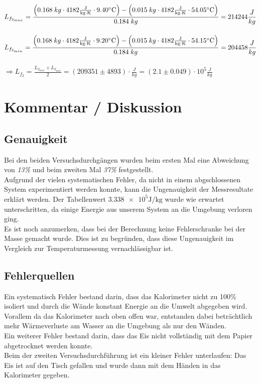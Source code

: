 \documentclass[a4paper,12pt]{article}
\begin{document}
$L_{f_{2_{max}}} =\displaystyle{\frac{\left(0.168\;kg \cdot 4182\rm{\frac{J}{kg \cdot K}}\cdot 9.40^{\circ}C \right)-\left(0.015\;kg\cdot 4182 \rm{\frac{J}{kg \cdot K}} \cdot 54.05^{\circ}C\right)}{0.184\;kg}} = 214244\frac{J}{kg}$\\\\

$L_{f_{2_{min}}} =\displaystyle{\frac{\left(0.168\;kg \cdot 4182\rm{\frac{J}{kg \cdot K}}\cdot 9.20^{\circ}C \right)-\left(0.015\;kg\cdot 4182 \rm{\frac{J}{kg \cdot K}} \cdot 54.15^{\circ}C\right)}{0.184\;kg}} = 204458\frac{J}{kg}$\\\\

$\Rightarrow L_{f_2}=\displaystyle{\frac{L_{2_{max}}+L_{2_{min}}}{2}=\left(209351\pm 4893\right) \cdot \frac{J}{kg}=\left(2.1\pm 0.049\right)\cdot 10^{5} \frac{J}{kg}}$

\newpage
\section{Kommentar / Diskussion}

\subsection{Genauigkeit}
Bei den beiden Versuchsdurchgängen wurden beim ersten Mal eine Abweichung von \textit{13\%} und beim zweiten Mal \textit{37\%} festgestellt.\\

Aufgrund der vielen systematischen Fehler, da nicht in einem abgschlossenen System experimentiert werden konnte, kann die Ungenauigkeit der Messresultate erklärt werden. Der Tabellenwert $ \num{3.338 e5}\si{\J\per\kg} $ wurde wie erwartet unterschritten, da einige Energie aus unserem System an die Umgebung verloren ging.\\

Es ist noch anzumerken, dass bei der Berechnung keine Fehlerschranke bei der Masse gemacht wurde. Dies ist zu begründen, dass diese Ungenauigkeit im Vergleich zur Temperaturmessung vernachlässigbar ist.

\subsection{Fehlerquellen}

Ein systematisch Fehler bestand darin, dass das Kalorimeter nicht zu 100\% isoliert und durch die Wände konstant Energie an die Umwelt abgegeben wird. Vorallem da das Kalorimeter nach oben offen war, entstanden dabei beträchtlich mehr Wärmeverluste am Wasser an die Umgebung als nur den Wänden.\\

Ein weiterer Fehler bestand darin, dass das Eis nicht vollständig mit dem Papier abgetrocknet werden konnte.\\

Beim der zweiten Versuchsdurchführung ist ein kleiner Fehler unterlaufen: Das Eis ist auf den Tisch gefallen und wurde dann mit dem Händen in das Kalorimeter gegeben.
\end{document}
